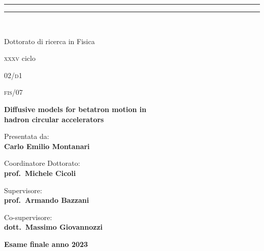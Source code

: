 \begin{titlepage}
\begin{center}
{
{{\Large{\textsc{}}}}} 
{\rule[0.1cm]{\textwidth}{0.1mm}}
{\rule[0.5cm]{\textwidth}{0.6mm}}
\\

\vspace{2em}

\Large{Dottorato di ricerca in Fisica}

\vspace{1ex}

\large{\textsc{xxxv} ciclo}
\end{center}

\vspace{3em}

 02/\textsc{d}1

\vspace{1ex}

 \textsc{fis}/07

\vfill

\begin{center}{
{\LARGE{\bf Diffusive models for betatron motion in \\ hadron circular accelerators}}\\
}\end{center}

\vfill %

\noindent
\begin{minipage}{.45\textwidth}
\begin{flushleft}
{\color{uniblack}Presentata da:}\\
\textbf{Carlo Emilio Montanari}
\end{flushleft}
\end{minipage}

\vfill

\noindent
\begin{minipage}[t]{.45\textwidth}
{\color{uniblack}Coordinatore Dottorato:}\\
\textbf{prof.\ Michele Cicoli}
\end{minipage}
\hfill
\begin{minipage}[t]{.45\textwidth}
\begin{flushright}
{\color{uniblack}Supervisore:}\\
\textbf{prof.\ Armando Bazzani}\\

\vspace{1em}

{\color{uniblack}Co-supervisore:}\\
\textbf{dott.\ Massimo Giovannozzi}
\end{flushright}
\end{minipage}

\vfill

\begin{center}
\textbf{Esame finale anno 2023}
\end{center}
\end{titlepage}
